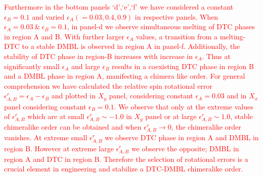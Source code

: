 \documentclass[12pt]{iopart}
\newcommand{\red}[1]{\textcolor{red}{#1}}
\begin{document}
\red{Furthermore in the bottom panels `d',`e',`f' we have considered a constant $\epsilon_{B} = 0.1$ and varied $\epsilon_{A}(=0.03,0.4,0.9)$ in respective panels. When $\epsilon_{A}=0.03~\&~ \epsilon_{B}=0.1$, in panel-d we observe simultaneous melting of DTC phases in region A and B. With further larger $\epsilon_{A}$ values, a transition from a melting-DTC to a stable DMBL is observed in region A in panel-f. Additionally, the stability of DTC phase in region-B increases with increase in $\epsilon_{A}$. Thus at significantly small $\epsilon_{A}$ and large $\epsilon_{B}$ results in a coexisting DTC phase in region B and a DMBL phase in region A, manifesting a chimera like order. For general comprehension we have calculated the relative spin rotational error $\epsilon^r_{A,B} = \epsilon_{A}-\epsilon_{B}$ and plotted in $X_y$ panel, considering constant $\epsilon_{A} = 0.03$ and in $X_x$ panel considering constant $\epsilon_{B} = 0.1$. We observe that only at the extreme values of $\epsilon^r_{A,B}$ which are at small $\epsilon^r_{A,B} \sim -1.0$ in $X_y$ panel or at large $\epsilon^r_{A,B} \sim 1.0$, stable chimeralike order can be obtained and when $\epsilon^r_{A,B}\rightarrow 0$, the chimeralike order vanishes. At extreme small $\epsilon^r_{A,B}$ we observe DTC phase in region A and DMBL in region B. However at extreme large $\epsilon^r_{A,B}$ we observe the opposite; DMBL in region A and DTC in region B. Therefore the selection of rotational errors is a crucial element in engineering and stabilize a DTC-DMBL chimeralike order.} 
\end{document}
